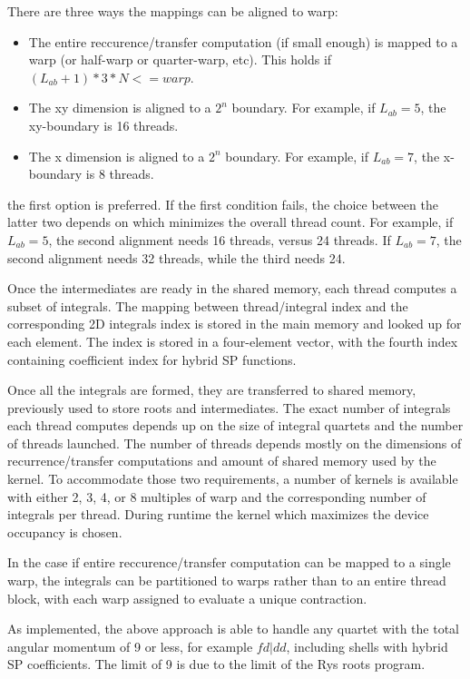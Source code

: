 \documentclass[12pt]{article}
\begin{document}
There are three ways the mappings can be aligned to warp:
\begin{itemize} 
\item The entire reccurence/transfer computation (if small enough) is
  mapped to a warp (or half-warp or quarter-warp, etc).  This holds if
  $(L_{ab}+1)*3*N <= warp$.
\item The xy dimension is aligned to a $2^n$ boundary. For example, if
$L_{ab} = 5$, the xy-boundary is 16 threads.
\item The x dimension is aligned to a $2^n$ boundary.  For example, if
$L_{ab} = 7$, the x-boundary is 8 threads.
\end{itemize}

the first option is preferred. If the first condition fails, the choice
between the latter two depends on which minimizes the overall thread count.
For example, if $L_{ab} = 5$, the second alignment needs 16 threads,
versus 24 threads.  If $L_{ab} = 7$, the second alignment needs 32
threads, while the third needs 24.

Once the intermediates are ready in the shared memory, each thread
computes a subset of integrals.  The mapping between thread/integral
index and the corresponding 2D integrals index is stored in the main
memory and looked up for each element.  The index is stored in a
four-element vector, with the fourth index containing coefficient
index for hybrid SP functions.
 
Once all the integrals are formed, they are transferred to shared
memory, previously used to store roots and intermediates.
The exact number of integrals each thread computes depends up on the
size of integral quartets and the number of threads launched.  The
number of threads depends mostly on the dimensions of
recurrence/transfer computations and amount of shared memory used by
the kernel.  To accommodate those two requirements, a number of
kernels is available with either 2, 3, 4, or 8 multiples of warp
and the corresponding number of integrals per thread.  During
runtime the kernel which maximizes the device occupancy is chosen.

In the case if entire reccurence/transfer computation can be mapped to
a single warp, the integrals can be partitioned to warps rather than
to an entire thread block, with each warp assigned to evaluate a
unique contraction.

As implemented, the above approach is able to handle any quartet with
the total angular momentum of 9 or less, for example $fd|dd$,
including shells with hybrid SP coefficients.  The limit of 9 is due
to the limit of the Rys roots program.
\end{document}
